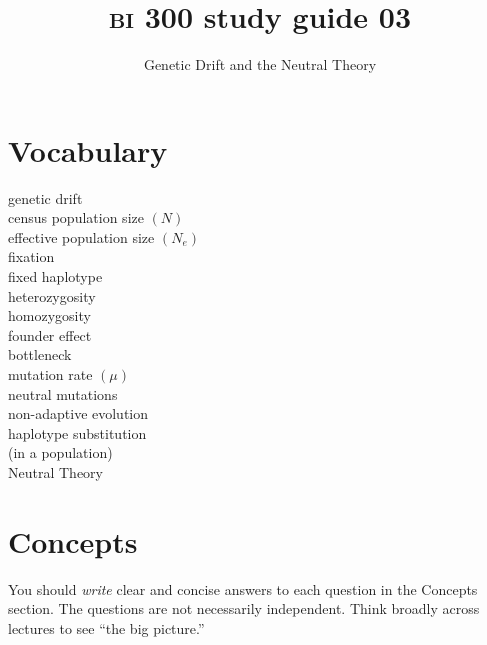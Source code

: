 \documentclass[letterpaper]{tufte-handout}
\title{{\scshape bi} 300 study guide 03\hfill}
\author{Genetic Drift and the Neutral Theory}
\date{} %
\begin{document}
\maketitle	%


\section{Vocabulary}
\vspace{-1\baselineskip}
\begin{multicols}{2}
genetic drift\\
census population size $(N)$\\
effective population size $(N_e)$\\
fixation\\
fixed haplotype\\
heterozygosity\\
homozygosity\\
founder effect\\
bottleneck\\
mutation rate $(\mu)$\\
neutral mutations\\
non-adaptive evolution\\
haplotype substitution\\\hspace{1em}(in a population)\\
Neutral Theory
\end{multicols}

\section{Concepts}

You should \emph{write} clear and concise answers to each question in the Concepts section.  The questions are not necessarily independent.  Think broadly across lectures to see ``the big picture.'' 
\end{document}
